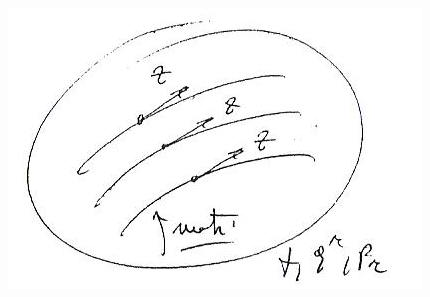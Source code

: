 \begin{flushleft}
  \begin{minipage}[c]{.5\textwidth}
    \includegraphics[width=0.75\columnwidth]{media/legame-tra-1-forma-di-poincare-cartan-e-dinamica/12-1.jpg}
  \end{minipage}
\end{flushleft}
